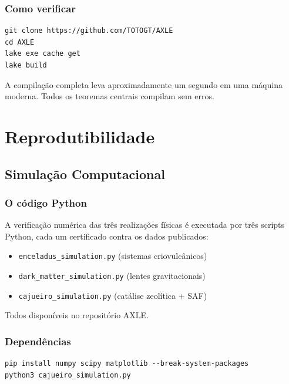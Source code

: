 \documentclass[12pt,a4paper,twoside]{book}
\theoremstyle{plain}
\theoremstyle{definition}
\theoremstyle{definition}
\begin{document}
\section{Como verificar}

\begin{verbatim}
git clone https://github.com/TOTOGT/AXLE
cd AXLE
lake exe cache get
lake build
\end{verbatim}

A compilação completa leva aproximadamente um segundo em uma máquina
moderna. Todos os teoremas centrais compilam sem erros.

\part{Reprodutibilidade}

\chapter{Simulação Computacional}
\label{cap:reproducibilidade}

\section{O código Python}

A verificação numérica das três realizações físicas é executada por
três scripts Python, cada um certificado contra os dados publicados:

\begin{itemize}
  \item \texttt{enceladus\_simulation.py} (sistemas criovulcânicos)
  \item \texttt{dark\_matter\_simulation.py} (lentes gravitacionais)
  \item \texttt{cajueiro\_simulation.py} (catálise zeolítica + SAF)
\end{itemize}

Todos disponíveis no repositório AXLE.

\section{Dependências}

\begin{verbatim}
pip install numpy scipy matplotlib --break-system-packages
python3 cajueiro_simulation.py
\end{verbatim}
\end{document}
